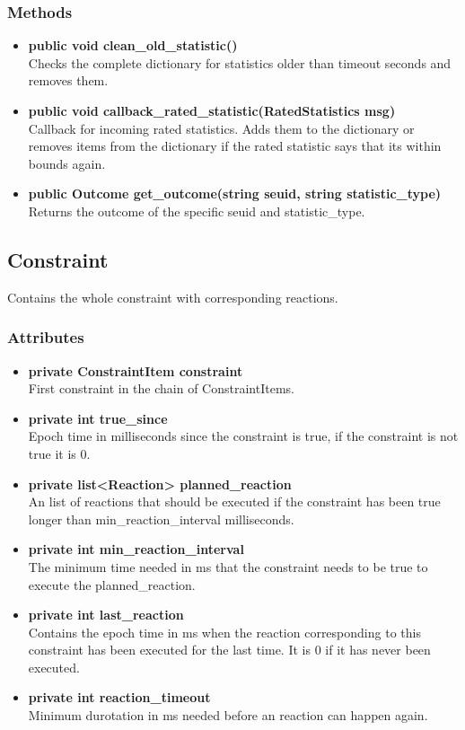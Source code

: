 \subsubsection{Methods}
\begin{itemize}
	\item \textbf{ public void clean\_old\_statistic() }\\
		Checks the complete dictionary for statistics older than timeout seconds and removes them.
	\item \textbf{ public void callback\_rated\_statistic(RatedStatistics msg) }\\
		Callback for incoming rated statistics. Adds them to the dictionary or removes items from the dictionary if the rated statistic says that its within bounds again. 
	\item \textbf{ public Outcome get\_outcome(string seuid, string statistic\_type) }\\
		Returns the outcome of the specific seuid and statistic\_type.
\end{itemize}

\subsection{Constraint }
Contains the whole constraint with corresponding reactions.


\subsubsection{Attributes}
\begin{itemize}
	\item \textbf{ private ConstraintItem constraint }\\
	First constraint in the chain of ConstraintItems.
	\item \textbf{ private int true\_since }\\
	Epoch time in milliseconds since the constraint is true,
	if the constraint is not true it is 0.
	\item \textbf{ private list<Reaction> planned\_reaction }\\
	An list of reactions that should be executed if the constraint has been true longer than min\_reaction\_interval milliseconds.
	\item \textbf{ private int min\_reaction\_interval }\\
	The minimum time needed in ms that the constraint needs to be true to execute the planned\_reaction.
	\item \textbf{ private int last\_reaction }\\
	Contains the epoch time in ms when the reaction corresponding to this constraint has been executed for the last time.
		It is 0 if it has never been executed.
	\item \textbf{ private int reaction\_timeout }\\
	Minimum durotation in ms needed before an reaction can happen again.
\end{itemize}
